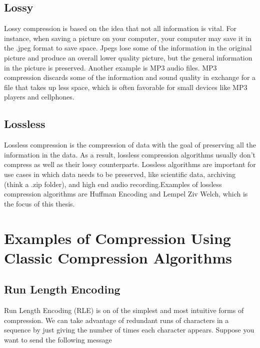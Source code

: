\documentclass[12pt,twoside]{reedthesis}
\begin{document}
\hypertarget{lossy}{%
\subsection{Lossy}\label{lossy}}

Lossy compression is based on the idea that not all information is vital. For instance, when saving a picture on your computer, your computer may save it in the .jpeg format to save space. Jpegs lose some of the information in the original picture and produce an overall lower quality picture, but the general information in the picture is preserved. Another example is MP3 audio files. MP3 compression discards some of the information and sound quality in exchange for a file that takes up less space, which is often favorable for small devices like MP3 players and cellphones.

\hypertarget{lossless}{%
\subsection{Lossless}\label{lossless}}

Lossless compression is the compression of data with the goal of preserving all the information in the data. As a result, lossless compression algorithms usually don't compress as well as their lossy counterparts. Lossless algorithms are important for use cases in which data needs to be preserved, like scientific data, archiving (think a .zip folder), and high end audio recording.Examples of lossless compression algorithms are Huffman Encoding and Lempel Ziv Welch, which is the focus of this thesis.

\hypertarget{examples-of-compression-using-classic-compression-algorithms}{%
\section{Examples of Compression Using Classic Compression Algorithms}\label{examples-of-compression-using-classic-compression-algorithms}}

\hypertarget{run-length-encoding}{%
\subsection{Run Length Encoding}\label{run-length-encoding}}

Run Length Encoding (RLE) is on of the simplest and most intuitive forms of compression. We can take advantage of redundant runs of characters in a sequence by just giving the number of times each character appears.
Suppose you want to send the following message
\end{document}
